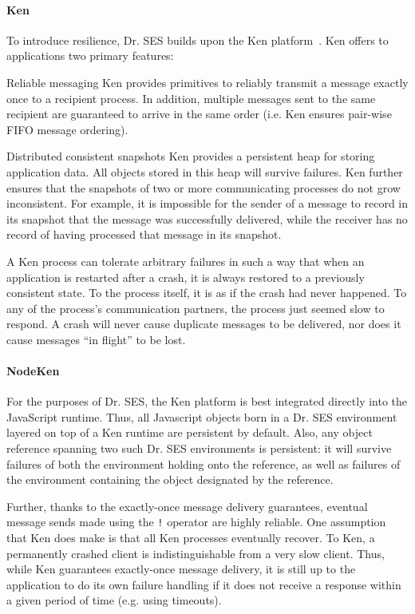 \documentclass{llncs}
\begin{document}
\paragraph{Ken}

To introduce resilience, Dr. SES builds upon the Ken platform~\cite{Yoo:CKen}. Ken offers to applications two primary features:

\begin{description*}
  \item[Reliable messaging] Ken provides primitives to reliably transmit a message exactly once to a recipient process. In addition, multiple messages sent to the same recipient are guaranteed to arrive in the same order (i.e. Ken ensures pair-wise FIFO message ordering).
  \item[Distributed consistent snapshots] Ken provides a persistent heap for storing application data. All objects stored in this heap will survive failures. Ken further ensures that the snapshots of two or more communicating processes do not grow inconsistent. For example, it is impossible for the sender of a message to record in its snapshot that the message was successfully delivered, while the receiver has no record of having processed that message in its snapshot.
\end{description*}

A Ken process can tolerate arbitrary failures in such a way that when an application is restarted after a crash, it is always restored to a previously consistent state. To the process itself, it is as if the crash had never happened. To any of the process's communication partners, the process just seemed slow to respond. A crash will never cause duplicate messages to be delivered, nor does it cause messages ``in flight'' to be lost.

\paragraph{NodeKen}

For the purposes of Dr. SES, the Ken platform is best integrated directly into the JavaScript runtime. Thus, all Javascript objects born in a Dr. SES environment layered on top of a Ken runtime are persistent by default. Also, any object reference spanning two such Dr. SES environments is persistent: it will survive failures of both the environment holding onto the reference, as well as failures of the environment containing the object designated by the reference.

Further, thanks to the exactly-once message delivery guarantees, eventual message sends made using the {\tt !} operator are highly reliable. One assumption that Ken does make is that all Ken processes eventually recover. To Ken, a permanently crashed client is indistinguishable from a very slow client. Thus, while Ken guarantees exactly-once message delivery, it is still up to the application to do its own failure handling if it does not receive a response within a given period of time (e.g. using timeouts).
\end{document}
